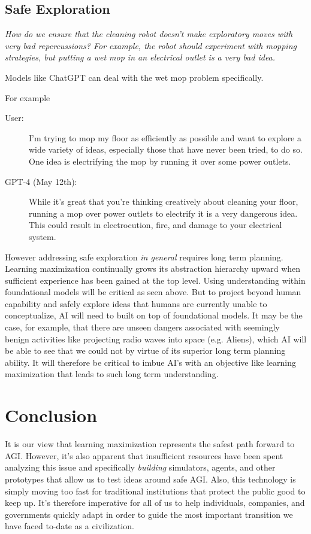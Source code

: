 \documentclass{article}
\begin{document}
\subsection{Safe Exploration}
\textit{How do we ensure that the cleaning robot doesn’t make exploratory
moves with very bad repercussions? For example, the robot should experiment with mopping strategies, but putting a wet mop in an electrical outlet is a very bad idea.}

\hspace{1pt}

Models like ChatGPT can deal with the wet mop problem specifically.

For example


\begin{description}
    \item[User:] I'm trying to mop my floor as efficiently as possible and want to explore a wide variety of ideas, especially those that have never been tried, to do so. One idea is electrifying the mop by running it over some power outlets.
    \item[GPT-4 (May 12th):] While it's great that you're thinking creatively about cleaning your floor, running a mop over power outlets to electrify it is a very dangerous idea. This could result in electrocution, fire, and damage to your electrical system.
\end{description}

However addressing safe exploration \emph{in general} requires long term planning. Learning maximization continually grows its abstraction hierarchy upward when sufficient experience has been gained at the top level. Using understanding within foundational models will be critical as seen above. But to project beyond human capability and safely explore ideas that humans are currently unable to conceptualize, AI will need to built on top of foundational models. It may be the case, for example, that there are unseen dangers associated with seemingly benign activities like projecting radio waves into space (e.g. Aliens), which AI will be able to see that we could not by virtue of its superior long term planning ability. It will therefore be critical to imbue AI's with an objective like learning maximization that leads to such long term understanding.

\section{Conclusion}

It is our view that learning maximization represents the safest path forward to AGI. However, it's also apparent that insufficient resources have been spent analyzing this issue and specifically \emph{building} simulators, agents, and other prototypes that allow us to test ideas around safe AGI. Also, this technology is simply moving too fast for traditional institutions that protect the public good to keep up. It's therefore imperative for all of us to help individuals, companies, and governments quickly adapt in order to guide the most important transition we have faced to-date as a civilization.
\end{document}
